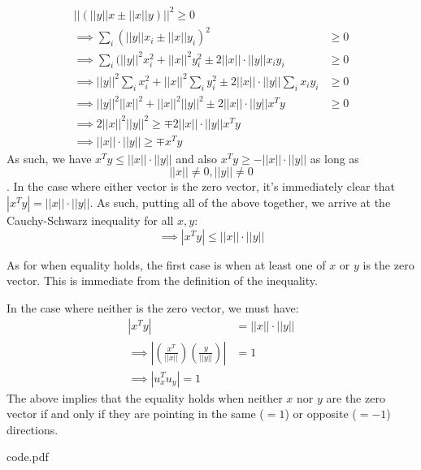 \documentclass[12pt]{exam}
\begin{document}
\begin{questions}
\begin{solution}
\begin{align*}
  || (||y|| x \pm ||x|| y) ||^2 \geq 0 \tag{Square of a real number is non-negative} \\
  \implies \sum_i (||y|| x_i \pm ||x|| y_i)^2 &\geq 0 \tag{Definition of vector norm} \\
  \implies \sum_i (||y||^2 x_i^2 + ||x||^2 y_i^2 \pm 2||x||\cdot||y||x_i y_i &\geq 0 \tag{Squaring inner sum term} \\
  \implies ||y||^2 \sum_i x_i^2 + ||x||^2 \sum_i y_i^2 \pm 2||x||\cdot||y|| \sum_i x_i y_i &\geq 0 \tag{Distributing the sum} \\
  \implies ||y||^2 ||x||^2 + ||x||^2 ||y||^2 \pm 2||x||\cdot||y|| x^Ty &\geq 0 \tag{Definition of vector norm and dot product} \\
  \implies 2 ||x||^2 ||y||^2 \geq \mp 2||x|| \cdot ||y|| x^Ty \tag{Some algebra}\\
  \implies ||x|| \cdot ||y|| \geq \mp x^T y \tag{When $||x|| \neq 0$ and $||y|| \neq 0$}
\end{align*}
As such, we have $x^Ty \leq ||x|| \cdot ||y||$ and also $x^T y \geq - ||x|| \cdot ||y||$ as long as $$||x|| \neq 0, ||y|| \neq 0$$. In the case where either vector is the zero vector, it's immediately clear that $|x^T y| = ||x || \cdot ||y||$. As such, putting all of the above together, we arrive at the Cauchy-Schwarz inequality for all $x,y$:
$$
\implies |x^Ty| \leq ||x|| \cdot ||y||
$$

As for when equality holds, the first case is when at least one of $x$ or $y$ is the zero vector. This is immediate from the definition of the inequality.

In the case where neither is the zero vector, we must have:
\begin{align*}
  |x^T y| &= ||x || \cdot ||y||\\
  \implies |\left(\frac{x^T}{||x||} \right)\left(\frac{y}{||y||} \right)| &= 1 \tag{Neither $x$ nor $y$ is the zero vector} \\
  \implies |u_x^T u_y| = 1 \tag{$u_v$ is the unit vector in the direction of $v$}
\end{align*}
The above implies that the equality holds when neither $x$ nor $y$ are the zero vector if and only if they are pointing in the same ($=1$) or opposite ($= -1$) directions.

\end{solution}

\end{questions}



{code.pdf}
\end{document}
